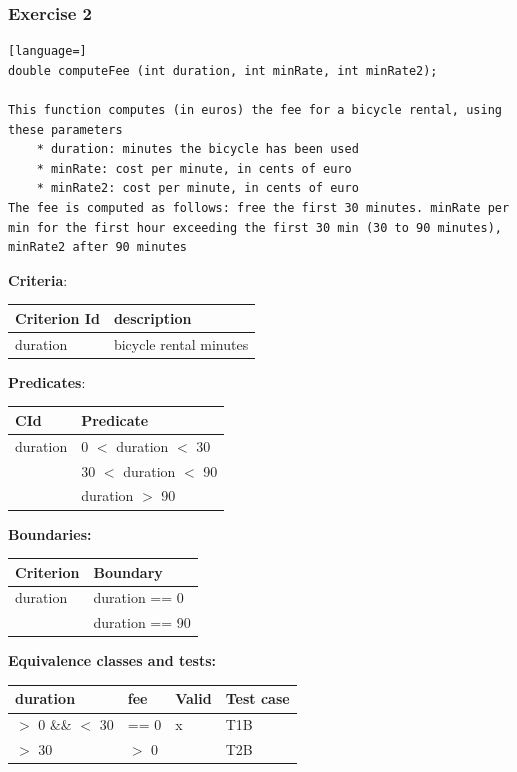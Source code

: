 \documentclass[12pt]{article}
\begin{document}
\subsubsection{Exercise 2}
\begin{lstlisting}[language=]
double computeFee (int duration, int minRate, int minRate2);

This function computes (in euros) the fee for a bicycle rental, using these parameters
    * duration: minutes the bicycle has been used
    * minRate: cost per minute, in cents of euro
    * minRate2: cost per minute, in cents of euro
The fee is computed as follows: free the first 30 minutes. minRate per min for the first hour exceeding the first 30 min (30 to 90 minutes), minRate2 after 90 minutes
\end{lstlisting}
\textbf{Criteria}:
\begin{center}
  \begin{tabular}{|l|l|}
    \hline
    Criterion Id & description \\
    \hline
    duration & bicycle rental minutes \\
    \hline
  \end{tabular}
\end{center}
\textbf{Predicates}:
\begin{center}
  \begin{tabular}{|l|l|}
    \hline
    CId & Predicate \\
    \hline
    duration & 0 $<$ duration $<$ 30 \\
    \hline
    & 30 $<$ duration $<$ 90 \\
    \hline
    & duration $>$ 90 \\
    \hline
  \end{tabular}
\end{center}
\textbf{Boundaries:}
\begin{center}
  \begin{tabular}{|l|l|}
    \hline
    Criterion & Boundary \\
    \hline
    duration & duration == 0 \\
    \hline
    & duration == 90 \\
    \hline
  \end{tabular}
\end{center}
\textbf{Equivalence classes and tests:}
\begin{center}
  \begin{tabular}{|l|l|l|l|}
    \hline
    duration & fee & Valid & Test case \\
    \hline
    $>$ 0 \&\& $<$ 30 & == 0 & x & T1B \\
    \hline
    $>$ 30 & $>$ 0 &  & T2B \\
    \hline
  \end{tabular}
\end{center}
\end{document}
